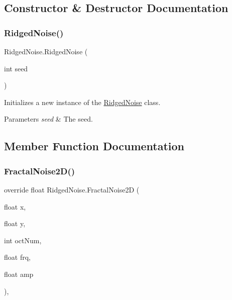 \subsection{Constructor \& Destructor Documentation}
\mbox{\label{class_ridged_noise_afd86e70bc7f353a07ca8d2c58c94578d}} 
\subsubsection{\texorpdfstring{Ridged\+Noise()}{RidgedNoise()}}
{\footnotesize\ttfamily Ridged\+Noise.\+Ridged\+Noise (\begin{DoxyParamCaption}\item[{int}]{seed }\end{DoxyParamCaption})\hspace{0.3cm}{\ttfamily [inline]}}



Initializes a new instance of the \hyperlink{class_ridged_noise}{Ridged\+Noise} class. 


\begin{DoxyParams}{Parameters}
{\em seed} & The seed.\\
\hline
\end{DoxyParams}


\subsection{Member Function Documentation}
\mbox{\label{class_ridged_noise_ae7d0d5d2eecc5305930c8d2f166d39f7}} 
\subsubsection{\texorpdfstring{Fractal\+Noise2\+D()}{FractalNoise2D()}}
{\footnotesize\ttfamily override float Ridged\+Noise.\+Fractal\+Noise2D (\begin{DoxyParamCaption}\item[{float}]{x,  }\item[{float}]{y,  }\item[{int}]{oct\+Num,  }\item[{float}]{frq,  }\item[{float}]{amp }\end{DoxyParamCaption})\hspace{0.3cm}{\ttfamily [inline]}, {\ttfamily [virtual]}}



